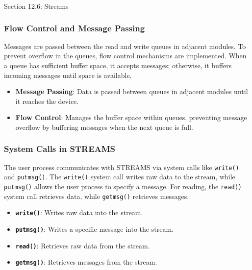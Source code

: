 \begin{notes}{Section 12.6: Streams}
\begin{highlight}
    \end{highlight}
    
    \subsubsection*{Flow Control and Message Passing}
    
    Messages are passed between the read and write queues in adjacent modules. To prevent overflow in the queues, flow control mechanisms are implemented. When a queue has sufficient buffer space, it 
    accepts messages; otherwise, it buffers incoming messages until space is available.
    
    \begin{highlight}
    
        \begin{itemize}
            \item \textbf{Message Passing}: Data is passed between queues in adjacent modules until it reaches the device.
            \item \textbf{Flow Control}: Manages the buffer space within queues, preventing message overflow by buffering messages when the next queue is full.
        \end{itemize}
    
    \end{highlight}
    
    \subsubsection*{System Calls in STREAMS}
    
    The user process communicates with STREAMS via system calls like \texttt{write()} and \texttt{putmsg()}. The \texttt{write()} system call writes raw data to the stream, while \texttt{putmsg()} 
    allows the user process to specify a message. For reading, the \texttt{read()} system call retrieves data, while \texttt{getmsg()} retrieves messages.
    
    \begin{highlight}
    
        \begin{itemize}
            \item \textbf{\texttt{write()}}: Writes raw data into the stream.
            \item \textbf{\texttt{putmsg()}}: Writes a specific message into the stream.
            \item \textbf{\texttt{read()}}: Retrieves raw data from the stream.
            \item \textbf{\texttt{getmsg()}}: Retrieves messages from the stream.
        \end{itemize}
    

\end{highlight}
\end{notes}

